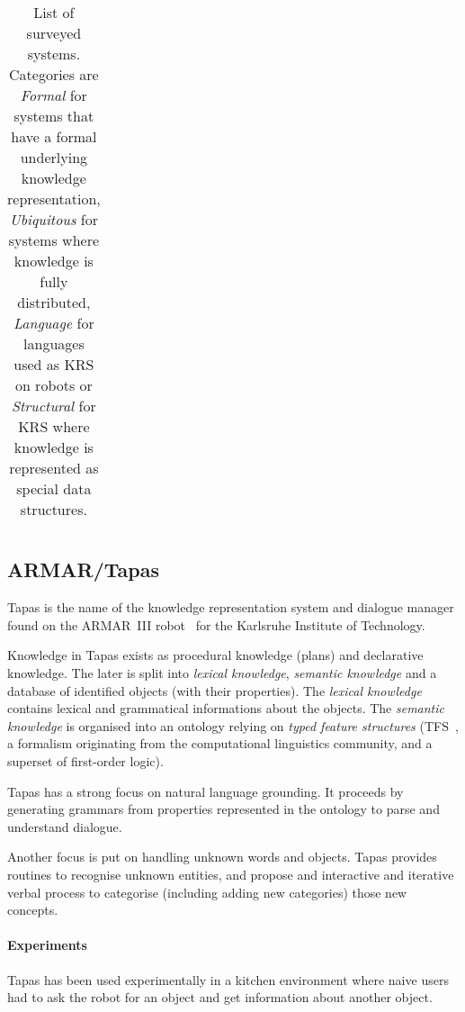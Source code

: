 \documentclass{IEEEtran}
\begin{document}
\begin{table*}
\begin{center}
\begin{tabular}{p{2.2cm}p{1.6cm}p{4cm}p{2.4cm}p{3.4cm}p{1.5cm}}
\bottomrule

\end{tabular}
\end{center}

\caption{List of surveyed systems. Categories are \emph{Formal} for systems
that have a formal underlying knowledge representation, \emph{Ubiquitous} for
systems where knowledge is fully distributed, \emph{Language} for languages
used as KRS on robots or \emph{Structural} for KRS where knowledge is
represented as special data structures.}

\label{table|surveyed-systems}
\end{table*}


\subsection{ARMAR/Tapas}

{\sc Tapas} is the name of the knowledge representation system and dialogue
manager found on the ARMAR~III robot~\cite{Holzapfel2008} for the Karlsruhe
Institute of Technology.

Knowledge in {\sc Tapas} exists as procedural knowledge (plans) and declarative
knowledge. The later is split into \emph{lexical knowledge}, \emph{semantic
knowledge} and a database of identified objects (with their properties). The
\emph{lexical knowledge} contains lexical and grammatical informations about
the objects. The \emph{semantic knowledge} is organised into an ontology
relying on \emph{typed feature structures} (TFS~\cite{Carpenter1992}, a
formalism originating from the computational linguistics community, and a
superset of first-order logic).

{\sc Tapas} has a strong focus on natural language grounding. It proceeds by
generating grammars from properties represented in the ontology to parse and
understand dialogue.

Another focus is put on handling unknown words and objects. {\sc Tapas}
provides routines to recognise unknown entities, and propose and interactive
and iterative verbal process to categorise (including adding new categories)
those new concepts.

\paragraph{Experiments} {\sc Tapas} has been used experimentally in a kitchen
environment where naive users had to ask the robot for an object and get
information about another object.
\end{document}
